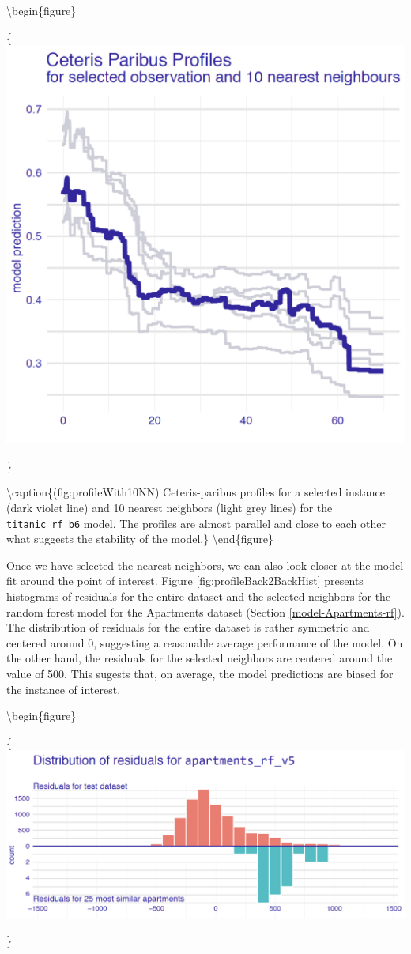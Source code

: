 \documentclass[12pt,]{krantz}
\theoremstyle{definition}
\theoremstyle{definition}
\theoremstyle{definition}
\theoremstyle{remark}
\begin{document}
\textbackslash{}begin\{figure\}

\{\centering \includegraphics[width=0.5\linewidth]{figure/example_cp}

\}

\textbackslash{}caption\{(fig:profileWith10NN) Ceteris-paribus profiles
for a selected instance (dark violet line) and 10 nearest neighbors
(light grey lines) for the \texttt{titanic\_rf\_b6} model. The profiles
are almost parallel and close to each other what suggests the stability
of the model.\}\label{fig:profileWith10NN} \textbackslash{}end\{figure\}

Once we have selected the nearest neighbors, we can also look closer at
the model fit around the point of interest. Figure
\ref{fig:profileBack2BackHist} presents histograms of residuals for the
entire dataset and the selected neighbors for the random forest model
for the Apartments dataset (Section \ref{model-Apartments-rf}). The
distribution of residuals for the entire dataset is rather symmetric and
centered around 0, suggesting a reasonable average performance of the
model. On the other hand, the residuals for the selected neighbors are
centered around the value of 500. This sugests that, on average, the
model predictions are biased for the instance of interest.

\textbackslash{}begin\{figure\}

\{\centering \includegraphics[width=0.7\linewidth]{figure/bb_hist}

\}
\end{document}
